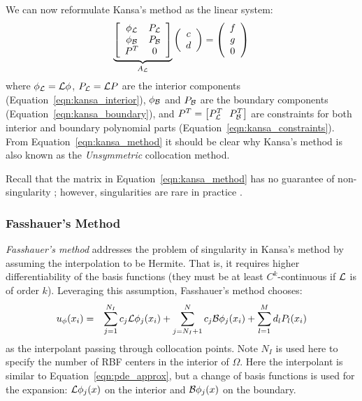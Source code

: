 \documentclass[11pt]{report}
\begin{document}
{We can now reformulate Kansa's method as the linear system: 
\begin{eqnarray}
\underbrace{\left[ \begin{array}{c c} 
	\phi_{\mathcal{L}} & P_{\mathcal{L}} \\
	\phi_{\mathcal{B}} & P_{\mathcal{B}} \\
	P^T & 0
	\end{array} \right]}_{A_{\mathcal{L}}}  \left( \begin{array}{c}
							{c} \\
							{d}
							 \end{array}
						 \right) = \left( \begin{array}{c}
							{f} \\
							{g} \\
							0
							 \end{array}
						 \right) 
	\label{eqn:kansa_method}
\end{eqnarray}
where $\phi_{\mathcal{L}} = \mathcal{L}\phi$, $P_{\mathcal{L}} = \mathcal{L}P$ are the interior components (Equation~\ref{eqn:kansa_interior}), $\phi_{\mathcal{B}}$ and $P_{\mathcal{B}}$ are the boundary components (Equation~\ref{eqn:kansa_boundary}), and $P^T = \left[P_\diffop{}^T \ \ P_\boundop{}^T\right]$ are constraints for both interior and boundary polynomial parts (Equation~\ref{eqn:kansa_constraints}). From Equation~\ref{eqn:kansa_method} it should be clear why Kansa's method is also known as the \emph{Unsymmetric} collocation method. 

Recall that the matrix in Equation~\ref{eqn:kansa_method} has no guarantee of non-singularity \cite{Fasshauer1997}; however, singularities are rare in practice \cite{Larsson2003}. 

\subsubsection{Fasshauer's Method}

\emph{Fasshauer's method} \cite{Fasshauer1997} addresses the problem of singularity in Kansa's method by assuming the interpolation to be Hermite. That is, it requires higher differentiability of the basis functions (they must be at least $C^k$-continuous if $\mathcal{L}$ is of order $k$). Leveraging this assumption, Fasshauer's method chooses: 
\begin{eqnarray}
u_\phi(x_i) & = & \sum_{j=1}^{N_I}  c_j \mathcal{L}\phi_j(x_i) + \sum_{j=N_{I} + 1}^{N} c_j \mathcal{B}\phi_j(x_i) + \sum_{l=1}^{M}d_l P_l(x_i)
\label{eqn:fasshauer_approx}
\end{eqnarray}
as the interpolant passing through collocation points. Note $N_I$ is used here to specify the number of RBF centers in the interior of $\Omega$. Here the interpolant is similar to Equation~\ref{eqn:pde_approx}, but a change of basis functions is used for the expansion: $\mathcal{L}\phi_j(x)$ on the interior and $\mathcal{B}\phi_j(x)$ on the boundary.

}
\end{document}
